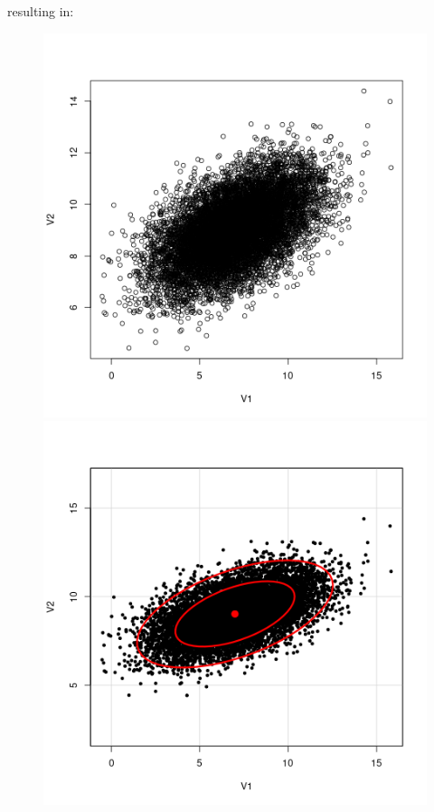 \documentclass[11pt, a4paper, reqno]{scrartcl}
\begin{document}
    resulting in:
    \begin{figure}[H]
        \includegraphics[height=0.4\paperheight]{dataPlot.png}
        \includegraphics[height=0.4\paperheight]{ellipsesPlot.png}
    \end{figure}
	
	
\end{document}
